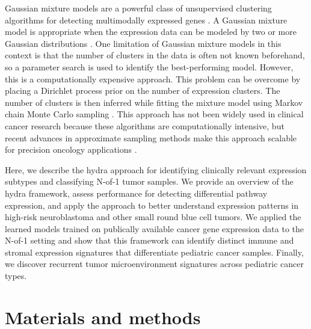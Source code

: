 \documentclass[10pt,letterpaper]{article}
\begin{document}
Gaussian mixture models are a powerful class of unsupervised clustering algorithms for detecting multimodally expressed genes \cite{ghoshMixtureModelsAssessing2004,dahlModelBasedClusteringExpression2006,kimVariableSelectionClustering2006}. A Gaussian mixture model is appropriate when the expression data can be modeled by two or more Gaussian distributions \cite{gelman2013bayesian}. One limitation of Gaussian mixture models in this context is that the number of clusters in the data is often not known beforehand, so a parameter search is used to identify the best-performing model. However, this is a computationally expensive approach. This problem can be overcome by placing a Dirichlet process prior on the number of expression clusters. The number of clusters is then inferred while fitting the mixture model using Markov chain Monte Carlo sampling \cite{gelman2013bayesian}. This approach has not been widely used in clinical cancer research because these algorithms are computationally intensive, but recent advances in approximate sampling methods make this approach scalable for precision oncology applications \cite{thallBayesianNonparametricStatistics2017}.

Here, we describe the hydra approach for identifying clinically relevant expression subtypes and classifying N-of-1 tumor samples. We provide an overview of the hydra framework, assess performance for detecting differential pathway expression, and apply the approach to better understand expression patterns in high-risk neuroblastoma and other small round blue cell tumors. We applied the learned models trained on publically available cancer gene expression data to the N-of-1 setting and show that this framework can identify distinct immune and stromal expression signatures that differentiate pediatric cancer samples. Finally, we discover recurrent tumor microenvironment signatures across pediatric cancer types.


\section*{Materials and methods}
\end{document}
